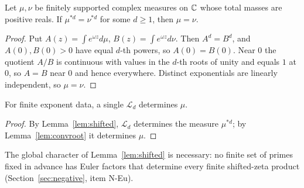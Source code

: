 \begin{lemma}\label{lem:convroot}
Let $\mu,\nu$ be finitely supported complex measures on $\mathbb{C}$ whose total masses are positive reals. If $\mu^{*d}=\nu^{*d}$ for some $d\ge1$, then $\mu=\nu$.
\end{lemma}

\begin{proof}
Put $A(z)=\int e^{\omega z}d\mu$, $B(z)=\int e^{\omega z}d\nu$. Then $A^d=B^d$, and $A(0),B(0)>0$ have equal $d$-th powers, so $A(0)=B(0)$. Near $0$ the quotient $A/B$ is continuous with values in the $d$-th roots of unity and equals $1$ at $0$, so $A=B$ near $0$ and hence everywhere. Distinct exponentials are linearly independent, so $\mu=\nu$.
\end{proof}

\begin{corollary}
For finite exponent data, a single $\mathcal{L}_d$ determines $\mu$.
\end{corollary}

\begin{proof}
By Lemma~\ref{lem:shifted}, $\mathcal{L}_d$ determines the measure $\mu^{*d}$; by Lemma~\ref{lem:convroot} it determines $\mu$.
\end{proof}

The global character of Lemma~\ref{lem:shifted} is necessary: no finite set of primes fixed in advance has Euler factors that determine every finite shifted-zeta product (Section~\ref{sec:negative}, item N-Eu).
